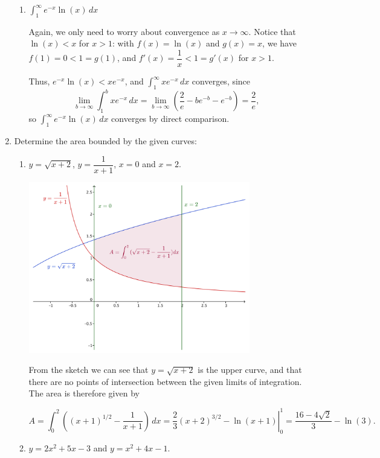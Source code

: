 \documentclass[12pt]{article}
\newcommand{\di}{\displaystyle}
\begin{document}
\begin{enumerate}
\begin{enumerate}
  \item $\di \int_1^\infty e^{-x}\ln(x)\,dx$
  
  Again, we only need to worry about convergence as $x\to \infty$. Notice that $\ln(x)<x$ for $x>1$: with $f(x)=\ln(x)$ and $g(x)=x$, we have $f(1)=0<1=g(1)$, and $f'(x)=\dfrac{1}{x}<1=g'(x)$ for $x>1$.
  
  Thus, $e^{-x}\ln(x)<xe^{-x}$, and $\di \int_1^\infty xe^{-x}\,dx$ converges, since
  \[
  \lim_{b\to\infty}\int_1^bxe^{-x}\,dx = \lim_{b\to\infty}\left(\frac{2}{e}-be^{-b}-e^{-b}\right)=\frac2e,
  \]
  so $\di \int_1^\infty e^{-x}\ln(x)\,dx$ converges by direct comparison.

 \end{enumerate}
 
 \item Determine the area bounded by the given curves:

 \begin{enumerate}
 \item $y=\sqrt{x+2}$, $y=\dfrac{1}{x+1}$, $x=0$ and $x=2$.
 
  \begin{center}
  \includegraphics[width=0.8\textwidth]{WS4-1a}
 \end{center}
From the sketch we can see that $y=\sqrt{x+2}$ is the upper curve, and that there are no points of intersection between the given limits of integration. The area is therefore given by

\[
 A = \int_0^2\left((x+1)^{1/2}-\frac{1}{x+1}\right)\,dx = \left.\frac{2}{3}(x+2)^{3/2}-\ln(x+1)\right|_0^1 = \frac{16-4\sqrt{2}}{3}-\ln(3).
\]

 \item $y=2x^2+5x-3$ and $y=x^2+4x-1$.
 

\end{enumerate}
\end{enumerate}
\end{document}
